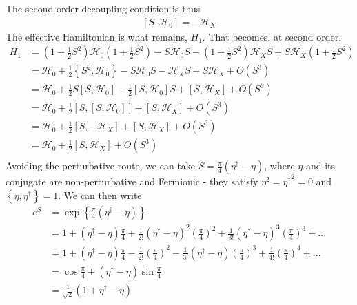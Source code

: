 \documentclass[twoside,11pt]{report}
\numberwithin{equation}{section}
\begin{document}
The second order decoupling condition is thus
\begin{equation}\begin{aligned}
	\label{dec_cond}
	\left[S,\mathcal{H}_0\right] = -\mathcal{H}_X
\end{aligned}\end{equation}
The effective Hamiltonian is what remains, \(H_1\). That becomes, at second order,
\begin{equation}\begin{aligned}
	H_1 &= \left(1 + \frac{1}{2} S^2\right) \mathcal{H}_0 \left(1 + \frac{1}{2} S^2\right) - S \mathcal{H}_0 S -\left(1 + \frac{1}{2} S^2\right) \mathcal{H}_X S + S \mathcal{H}_X \left(1 + \frac{1}{2} S^2\right)\\
    &= \mathcal{H}_0 + \frac{1}{2} \left\{S^2, \mathcal{H}_0\right\} - S \mathcal{H}_0 S - \mathcal{H}_X S + S \mathcal{H}_X + O(S^3)\\
    &= \mathcal{H}_0 + \frac{1}{2} S\left[S, \mathcal{H}_0\right] - \frac{1}{2} \left[S, \mathcal{H}_0\right]S  + \left[S,\mathcal{H}_X\right] + O(S^3)\\
    &= \mathcal{H}_0 + \frac{1}{2} \left[S,\left[S, \mathcal{H}_0\right]\right] + \left[S,\mathcal{H}_X\right] + O(S^3)\\
    &= \mathcal{H}_0 + \frac{1}{2} \left[S,-\mathcal{H}_X\right] + \left[S,\mathcal{H}_X\right] + O(S^3)\\
    &= \mathcal{H}_0 + \frac{1}{2}\left[S,\mathcal{H}_X\right] + O(S^3)\\
\end{aligned}\end{equation}
Avoiding the perturbative route, we can take \(S = \frac{\pi}{4}\left(\eta^\dagger - \eta\right)\), where \(\eta\) and its conjugate are non-perturbative and Fermionic - they satisfy \(\eta^2 = {\eta^\dagger}^2 = 0\) and \(\left\{\eta,\eta^\dagger\right\}=1\). We can then write
\begin{equation}\begin{aligned}
	e^S &= \exp\left\{\frac{\pi}{4}\left(\eta^\dagger - \eta\right)\right\} \\
	    &= 1 + \left(\eta^\dagger - \eta\right)\frac{\pi}{4} + \frac{1}{2!}\left(\eta^\dagger - \eta\right)^2\left(\frac{\pi}{4}\right)^2 + \frac{1}{3!}\left(\eta^\dagger - \eta\right)^3\left(\frac{\pi}{4}\right)^3 + ...\\
	    &= 1 + \left(\eta^\dagger - \eta\right)\frac{\pi}{4} - \frac{1}{2!}\left(\frac{\pi}{4}\right)^2 - \frac{1}{3!}\left(\eta^\dagger - \eta\right)\left(\frac{\pi}{4}\right)^3 + \frac{1}{4!}\left(\frac{\pi}{4}\right)^4 + ...\\
	    &= \cos \frac{\pi}{4} + \left(\eta^\dagger - \eta\right)\sin\frac{\pi}{4}\\
	    &= \frac{1}{\sqrt 2}\left(1 + \eta^\dagger - \eta\right)
\end{aligned}\end{equation}
\end{document}
